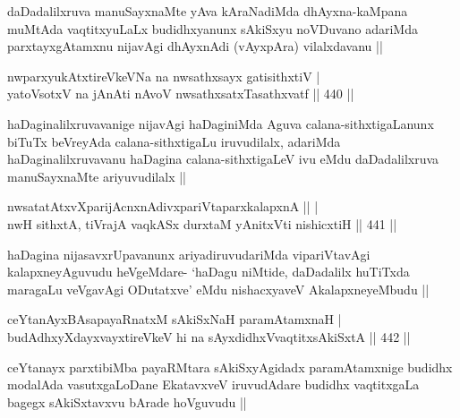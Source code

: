 \begin{artha}
daDadalilxruva manuSayxnaMte yAva kAraNadiMda dhAyxna-kaMpana muMtAda vaqtitxyuLaLx budidhxyanunx sAkiSxyu noVDuvano adariMda parxtayxgAtamxnu nijavAgi dhAyxnAdi (vAyxpAra) vilalxdavanu ||
\end{artha}


\begin{shl}
nwparxyukAtxtireVkeVNa na nwsathxsayx gatisithxtiV | \\
yatoV\s sotxV na jAnAti nAvoV nwsathxsatxTasathxvatf \hfill||  440 ||  
\end{shl}

\begin{artha}
haDaginalilxruvavanige nijavAgi haDaginiMda Aguva calana-sithxtigaLanunx biTuTx beVreyAda calana-sithxtigaLu iruvudilalx, adariMda haDaginalilxruvavanu haDagina calana-sithxtigaLeV ivu eMdu daDadalilxruva manuSayxnaMte ariyuvudilalx ||
\end{artha}

\begin{shl}
nwsatatAtxvXparijAcnxnAdivxpariVtaparxkalapxnA ||  | \\
nwH sithxtA, tiVrajA vaqkASx durxtaM yAnitxVti nishicxtiH \hfill||  441 ||  
\end{shl}

\begin{artha}
haDagina nijasavxrUpavanunx ariyadiruvudariMda vipariVtavAgi kalapxneyAguvudu heVgeMdare- `haDagu niMtide, daDadalilx huTiTxda maragaLu veVgavAgi ODutatxve' eMdu nishacxyaveV AkalapxneyeMbudu ||
\end{artha}


\begin{shl}
ceYtanAyxBAsapayaRnatxM sAkiSxNaH paramAtamxnaH | \\
budAdhxyXdayxvayxtireVkeV hi na sAyxdidhxVvaqtitxsAkiSxtA \hfill||  442 ||  
\end{shl}

\begin{artha}
ceYtanayx parxtibiMba payaRMtara sAkiSxyAgidadx paramAtamxnige budidhx modalAda vasutxgaLoDane EkatavxveV iruvudAdare budidhx vaqtitxgaLa bagegx sAkiSxtavxvu bArade hoVguvudu ||
\end{artha}


